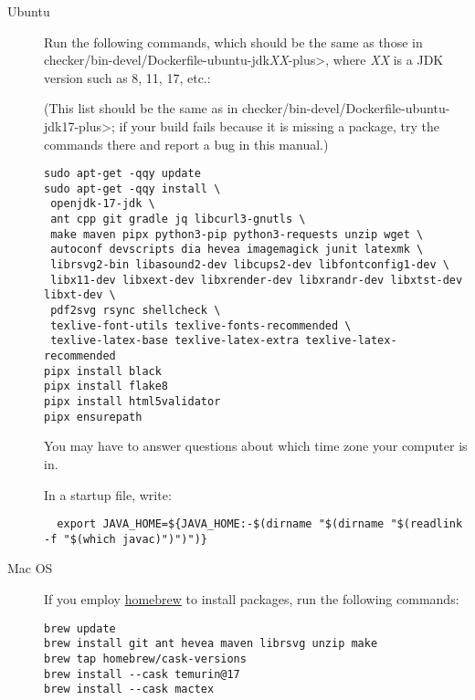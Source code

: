 \begin{description}
\item[Ubuntu]
  Run the following commands, which should be the same as those in
  \<checker/bin-devel/Dockerfile-ubuntu-jdk\emph{XX}-plus>, where \emph{XX}
  is a JDK version such as 8, 11, 17, etc.:

(This list should be the same as in
\<checker/bin-devel/Dockerfile-ubuntu-jdk17-plus>; if your build fails
because it is missing a package, try the commands there and report a bug
in this manual.)


\begin{Verbatim}
sudo apt-get -qqy update
sudo apt-get -qqy install \
 openjdk-17-jdk \
 ant cpp git gradle jq libcurl3-gnutls \
 make maven pipx python3-pip python3-requests unzip wget \
 autoconf devscripts dia hevea imagemagick junit latexmk \
 librsvg2-bin libasound2-dev libcups2-dev libfontconfig1-dev \
 libx11-dev libxext-dev libxrender-dev libxrandr-dev libxtst-dev libxt-dev \
 pdf2svg rsync shellcheck \
 texlive-font-utils texlive-fonts-recommended \
 texlive-latex-base texlive-latex-extra texlive-latex-recommended
pipx install black
pipx install flake8
pipx install html5validator
pipx ensurepath
\end{Verbatim}

  You may have to answer questions about which time zone your computer is in.

In a startup file, write:
\begin{smaller}
\begin{Verbatim}
  export JAVA_HOME=${JAVA_HOME:-$(dirname "$(dirname "$(readlink -f "$(which javac)")")")}
\end{Verbatim}
\end{smaller}

\item[Mac OS]
  If you employ \href{https://brew.sh}{homebrew} to install packages, run
  the following commands:

\begin{Verbatim}
brew update
brew install git ant hevea maven librsvg unzip make
brew tap homebrew/cask-versions
brew install --cask temurin@17
brew install --cask mactex
\end{Verbatim}


\end{description}
